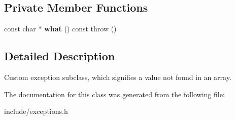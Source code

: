 \subsection*{Private Member Functions}
\begin{DoxyCompactItemize}
\item 
\mbox{\label{classValueNotFoundError_a46595dbe7471a2b20ee246bceec01487}} 
const char $\ast$ {\bfseries what} () const  throw ()
\end{DoxyCompactItemize}


\subsection{Detailed Description}
Custom exception subclass, which signifies a value not found in an array. 

The documentation for this class was generated from the following file\+:\begin{DoxyCompactItemize}
\item 
include/exceptions.\+h\end{DoxyCompactItemize}
